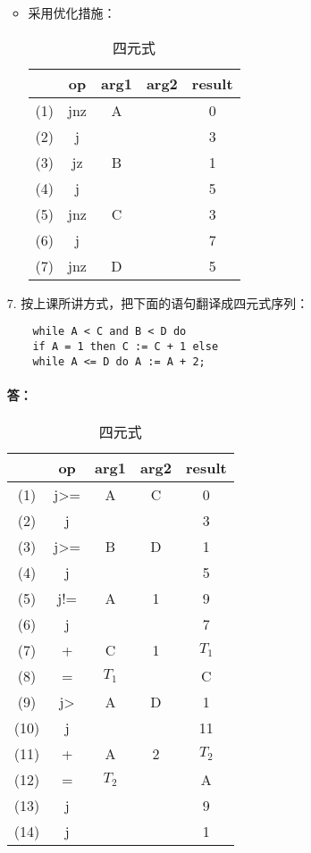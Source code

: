 \documentclass[]{ctexart}
\begin{document}
\begin{enumerate}
\begin{itemize}
		\item 采用优化措施：
		\begin{table}[H]
			\centering
			\caption{四元式}
			\begin{tabular}{|c|c|c|c|c|}
				\hline
				~ & op & arg1 & arg2 & result \\\hline
				(1) & jnz & A & ~ & 0 \\
				(2) & j & ~ & ~ & 3 \\
				(3) & jz & B & ~ & 1 \\
				(4) & j & ~ & ~ & 5 \\
				(5) & jnz & C & ~ & 3 \\
				(6) & j & ~ & ~ & 7 \\
				(7) & jnz & D & ~ & 5 \\
			\end{tabular}
		\end{table}
	\end{itemize}
	
	\item[7.] 按上课所讲方式，把下面的语句翻译成四元式序列：
	\begin{lstlisting}
	while A < C and B < D do
	if A = 1 then C := C + 1 else
	while A <= D do A := A + 2;
	\end{lstlisting}
	\paragraph{答：}
	\begin{table}[H]
		\centering
		\caption{四元式}
		\begin{tabular}{|c|c|c|c|c|}
			\hline
			~ & op & arg1 & arg2 & result \\\hline
			(1) & j>= & A & C & 0 \\
			(2) & j & ~ & ~ & 3 \\
			(3) & j>= & B & D & 1 \\
			(4) & j & ~ & ~ & 5 \\
			(5) & j!= & A & 1 & 9\\
			(6) & j & ~ & ~ & 7 \\
			(7) & + & C & 1 & $T_{1}$ \\
			(8) & = & $T_{1}$ & ~ & C \\
			(9) & j> & A & D & 1 \\
			(10) & j & ~ & ~ & 11 \\
			(11) & + & A & 2 & $T_{2}$ \\
			(12) & = & $T_{2}$ & ~ & A \\
			(13) & j & ~ & ~ & 9 \\
			(14) & j & ~ & ~ & 1 \\\hline
		\end{tabular}
	\end{table}
\end{enumerate}
\end{document}
